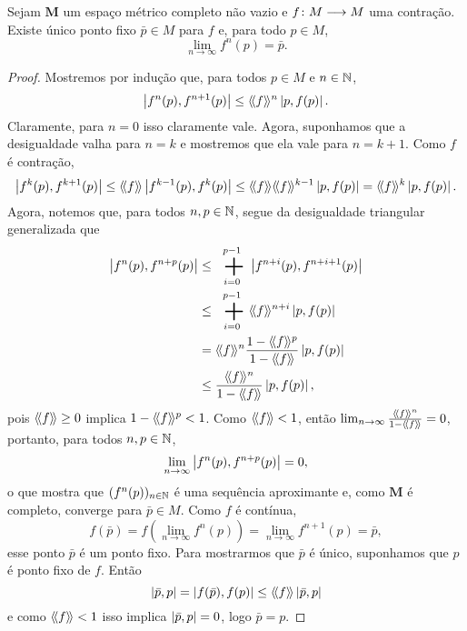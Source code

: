 \begin{proposition}
\label{prop:ponto.fixo.contracao}
Sejam $\bm M$ um espaço métrico completo não vazio e $f\colon \allowbreak M \longrightarrow M$ uma contração. Existe único ponto fixo $\bar p \in M$ para $f$ e, para todo $p \in M$,
	\begin{equation*}
	\lim_{n \to \infty} f^n(p) = \bar p.
	\end{equation*}
\end{proposition}
\begin{proof}
Mostremos por indução que, para todos $p \in M$ e $n \in \mathbb{N}$,
	\begin{equation*}
	\left\vert{f^n(p)},{f^{n+1}(p)}\right\vert \leq \langle\!\langle{f}\rangle\!\rangle^n \left\vert{p},{f(p)}\right\vert.
	\end{equation*}
Claramente, para $n=0$ isso claramente vale. Agora, suponhamos que a desigualdade valha para $n=k$ e mostremos que ela vale para $n=k+1$. Como $f$ é contração,
	\begin{equation*}
	\dist{f^k(p)}{f^{k+1}(p)} \leq \distor{f} \dist{f^{k-1}(p)}{f^k(p)} \leq \distor{f} \distor{f}^{k-1} \dist{p}{f(p)} = \distor{f}^k \dist{p}{f(p)}.
	\end{equation*}
Agora, notemos que, para todos $n,p \in \mathbb{N}$, segue da desigualdade triangular generalizada que
	\begin{align*}
	\dist{f^n(p)}{f^{n+p}(p)} &\leq \sum_{i=0}^{p-1} \dist{f^{n+i}(p)}{f^{n+i+1}(p)} \\
		&\leq \sum_{i=0}^{p-1} \distor{f}^{n+i} \dist{p}{f(p)} \\
		&= \distor{f}^n\frac{1-\distor{f}^p}{1-\distor{f}} \dist{p}{f(p)} \\
		&\leq \frac{\distor{f}^n}{1-\distor{f}} \dist{p}{f(p)},
	\end{align*}
pois $\langle\!\langle{f}\rangle\!\rangle\geq 0$ implica $1-\langle\!\langle{f}\rangle\!\rangle^p<1$. Como $\langle\!\langle{f}\rangle\!\rangle<1$, então $\lim_{n \to \infty} \frac{\langle\!\langle{f}\rangle\!\rangle^n}{1-\langle\!\langle{f}\rangle\!\rangle} = 0$, portanto, para todos $n,p \in \mathbb{N}$,
	\begin{equation*}
	\lim_{n \to \infty} \left\vert{f^n(p)},{f^{n+p}(p)}\right\vert = 0,
	\end{equation*}
o que mostra que $(f^n(p))_{n \in \mathbb{N}}$ é uma sequência aproximante e, como $\bm M$ é completo, converge para $\bar p \in M$. Como $f$ é contínua,
	\begin{equation*}
	f(\bar p) = f\left(\lim_{n \to \infty} f^n(p)\right) = \lim_{n \to \infty} f^{n+1}(p) = \bar p,
	\end{equation*}
esse ponto $\bar p$ é um ponto fixo. Para mostrarmos que $\bar p$ é único, suponhamos que $p$ é ponto fixo de $f$. Então
	\begin{equation*}
	\left\vert{\bar p},{p}\right\vert = \left\vert{f(\bar p)},{f(p)}\right\vert \leq \langle\!\langle{f}\rangle\!\rangle \left\vert{\bar p},{p}\right\vert
	\end{equation*}
e como $\langle\!\langle{f}\rangle\!\rangle<1$ isso implica $\left\vert{\bar p},{p}\right\vert=0$, logo $\bar p=p$.
\end{proof}

